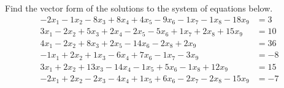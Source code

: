 Find the vector form of the solutions to the system of equations below.
%
\begin{align*}
 -2 x_1 -1 x_2 -8 x_3+ 8 x_4+ 4 x_5 -9 x_6 -1 x_7 -1 x_8 -18 x_9 &= 3 \\
 3 x_1 -2 x_2+ 5 x_3+ 2 x_4 -2 x_5 -5 x_6+ 1 x_7+ 2 x_8+ 15 x_9 &= 10 \\
 4 x_1 -2 x_2+ 8 x_3+  2 x_5 -14 x_6 -2 x_8+ 2 x_9 &= 36 \\
 -1 x_1+ 2 x_2+ 1 x_3 -6 x_4+  7 x_6 -1 x_7 -3 x_9 &= -8 \\
 3 x_1+ 2 x_2+ 13 x_3 -14 x_4 -1 x_5+ 5 x_6 -1 x_8+ 12 x_9 &= 15 \\
 -2 x_1+ 2 x_2 -2 x_3 -4 x_4+ 1 x_5+ 6 x_6 -2 x_7 -2 x_8 -15 x_9 &= -7
\end{align*}
